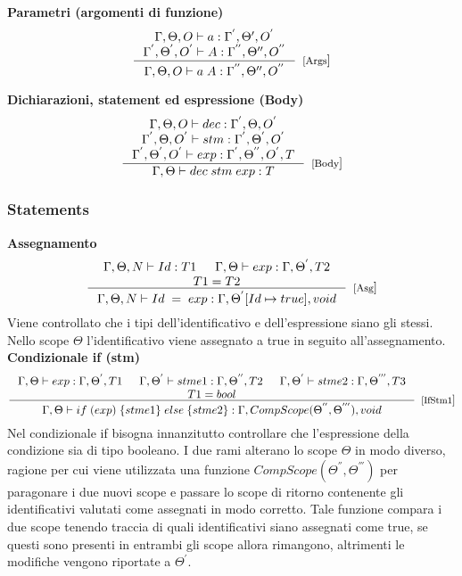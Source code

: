 \textbf{Parametri (argomenti di funzione)}
\[
\inference{\Gamma, \Theta, O \vdash a: \Gamma^{'}, \Theta{'}, O^{'} \\ \Gamma^{'}, \Theta^{'}, O^{'} \vdash A: \Gamma^{''}, \Theta{''}, O^{''} }{\Gamma, \Theta, O \vdash a \; A: \Gamma^{''}, \Theta{''}, O^{''} }[[Args]]
\]

\textbf{Dichiarazioni, statement ed espressione (Body)}
\[
\inference{\Gamma, \Theta, O \vdash dec:\Gamma^{'}, \Theta, O^{'} \\ \Gamma^{'}, \Theta, O^{'} \vdash stm:\Gamma^{'}, \Theta^{'}, O^{'} \\ \Gamma^{'}, \Theta^{'}, O^{'} \vdash exp:\Gamma^{'}, \Theta^{''}, O^{'}, T}{\Gamma, \Theta \vdash dec \; stm \; exp: T}[[Body]]
\]

\subsubsection{Statements}
\textbf{Assegnamento}
\[
\inference{\Gamma, \Theta, N \vdash Id:T1 & \Gamma, \Theta \vdash exp:\Gamma, \Theta^{'}, T2 \\ T1 = T2}{\Gamma, \Theta, N \vdash Id \; = \; exp: \Gamma, \Theta^{'}[Id\mapsto true], void}[[Asg]]
\]
Viene controllato che i tipi dell'identificativo e dell'espressione siano gli stessi. Nello scope $\Theta$ l'identificativo viene assegnato a true in seguito all'assegnamento. \\

\textbf{Condizionale if (stm)} 
\[
\inference{\Gamma, \Theta \vdash exp:\Gamma, \Theta^{'}, T1 & \Gamma, \Theta^{'} \vdash stme1:\Gamma, \Theta^{''}, T2 & \Gamma, \Theta^{'} \vdash stme2:\Gamma, \Theta^{'''}, T3 \\ T1 = bool }{\Gamma, \Theta \vdash if\; (exp)\; \{ stme1 \}\; else\; \{stme2\}: \Gamma, CompScope(\Theta^{''}, \Theta^{'''}), void}[[IfStm1]]
\]
Nel condizionale if bisogna innanzitutto controllare che l'espressione della condizione sia di tipo booleano. I due rami alterano lo scope $\Theta$ in modo diverso, ragione per cui viene utilizzata una funzione $CompScope(\Theta^{''}, \Theta^{'''})$ per paragonare i due nuovi scope e passare lo scope di ritorno contenente gli identificativi valutati come assegnati in modo corretto. Tale funzione compara i due scope tenendo traccia di quali identificativi siano assegnati come true, se questi sono presenti in entrambi gli scope allora rimangono, altrimenti le modifiche vengono riportate a $\Theta^{'}$.\\

